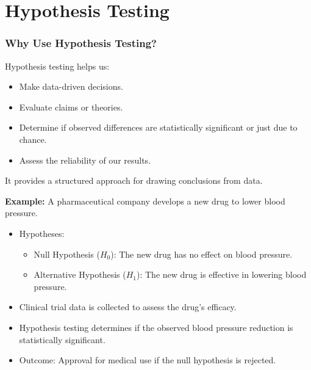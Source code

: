 \documentclass[notes,10pt, aspectratio=169]{beamer}
\begin{document}
\section{Hypothesis Testing}
\begin{frame}
    \frametitle{Why Use Hypothesis Testing?}
    
    Hypothesis testing helps us:
    
    \begin{itemize}
        \item Make data-driven decisions.
        \item Evaluate claims or theories.
        \item Determine if observed differences are statistically significant or just due to chance.
        \item Assess the reliability of our results.
    \end{itemize}
    
    It provides a structured approach for drawing conclusions from data.

    \textbf{Example:} A pharmaceutical company develops a new drug to lower blood pressure.
    \begin{itemize}
        \item Hypotheses:
            \begin{itemize}
                \item Null Hypothesis ($H_0$): The new drug has no effect on blood pressure.
                \item Alternative Hypothesis ($H_1$): The new drug is effective in lowering blood pressure.
            \end{itemize}
        \item Clinical trial data is collected to assess the drug's efficacy.
        \item Hypothesis testing determines if the observed blood pressure reduction is statistically significant.
        \item Outcome: Approval for medical use if the null hypothesis is rejected.
    \end{itemize}
    
\end{frame}
\end{document}

